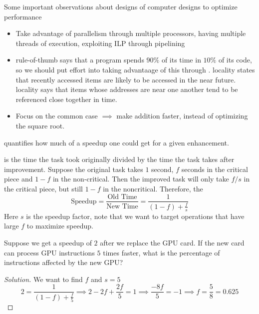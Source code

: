 \documentclass[12pt]{scrartcl}
\begin{document}
\begin{note}
  Some important observations about designs of computer designs to optimize performance
  \begin{itemize}
    \item Take advantage of parallelism through multiple processors, having multiple threads of execution, exploiting ILP through pipelining
    \item {} rule-of-thumb says that a program spends $90\%$ of its time in $10\%$ of its code, so we should put effort into taking advantaage of this through .
     locality states that recently accessed items are likely to be accessed in the near future.  locality says that 
    items whose addresses are near one another tend to be referenced close together in time. 
    \item Focus on the common case $\implies$ make addition faster, instead of optimizing the square root.
  \end{itemize}
\end{note}

\begin{theorem}
   quantifies how much of a speedup one could get for a given enhancement. 

  \hfill

   is the time the task took originally divided by the time
  the task takes after improvement. Suppose the original task takes $1$ second, $f$ seconds in the critical piece and $1-f$ in the non-critical. 
  Then the improved task will only take $f/s$ in the critical piece, but still $1-f$ in the noncritical. Therefore, the 
  \[\text{Speedup} = \frac{\text{Old Time}}{\text{New Time}} = \frac{1}{(1-f) +\frac{f}{s}}\]
  Here $s$ is the speedup factor, note that we want to target operations that have large $f$ to maximize speedup.
\end{theorem}

\begin{example}
  Suppose we get a speedup of $2$ after we replace the GPU card. If the new card can process GPU instructions $5$ times faster, 
  what is the percentage of instructions affected by the new GPU?

  \begin{proof}[Solution]
    We want to find $f$ and $s =5$ 
    \[2 = \frac{1}{(1-f) + \frac{f}{5}} \implies 2 - 2f + \frac{2f}{5} = 1 \implies \frac{-8f}{5} = -1 \implies f = \frac{5}{8} = 0.625 \]
  \end{proof}
\end{example}
\end{document}
